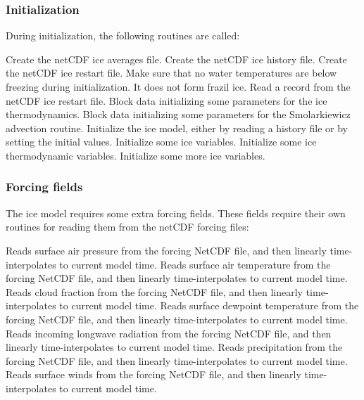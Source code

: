 \subsubsection{Initialization}
During initialization, the following routines are called:
\begin{klist}
    Create the netCDF ice averages file.
    Create the netCDF ice history file.
    Create the netCDF ice restart file.
      Make sure that no water temperatures are below
freezing during initialization. It does not form frazil ice.
    Read a record from the netCDF ice restart file.
    Block data initializing some parameters for the
ice thermodynamics.
    Block data initializing some parameters for the
Smolarkiewicz advection routine.
   Initialize the ice model, either by reading a
history file or by setting the initial values.
    Initialize some ice variables.
    Initialize some ice thermodynamic variables.
    Initialize some more ice variables.
\end{klist}

\subsubsection{Forcing fields} The ice model requires some extra
forcing fields. These fields require their own routines for reading
them from the netCDF forcing files:
\begin{klist}
       Reads surface air pressure
   from the forcing NetCDF file, and then linearly
   time-interpolates to current model time.
       Reads surface air temperature
   from the forcing NetCDF file, and then linearly
   time-interpolates to current model time.
       Reads cloud fraction
   from the forcing NetCDF file, and then linearly
   time-interpolates to current model time.
       Reads surface dewpoint temperature
   from the forcing NetCDF file, and then linearly
   time-interpolates to current model time.
       Reads incoming longwave radiation
   from the forcing NetCDF file, and then linearly
   time-interpolates to current model time.
       Reads precipitation
   from the forcing NetCDF file, and then linearly
   time-interpolates to current model time.
       Reads surface winds
   from the forcing NetCDF file, and then linearly
   time-interpolates to current model time.
\end{klist}


